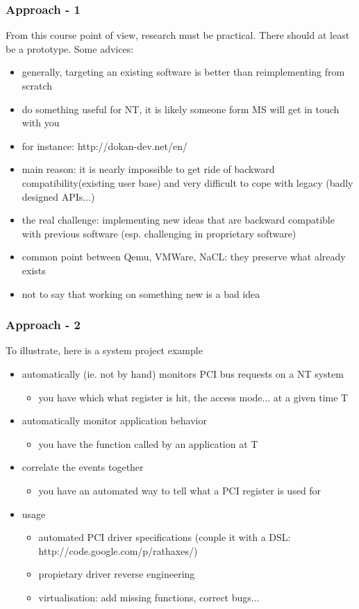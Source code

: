 \begin{frame}
  \frametitle{Approach - 1}
  From this course point of view, research must be practical.
  There should at least be a prototype. Some advices:
  \begin{itemize}
    \item
      generally, targeting an existing software is better than reimplementing from scratch
    \item
      do something useful for NT, it is likely someone form MS will get in touch with you
    \item
      for instance: http://dokan-dev.net/en/
    \item
      main reason: it is nearly impossible to get ride of backward compatibility(existing user base) and very difficult to cope with legacy (badly designed APIs...)
    \item
      the real challenge: implementing new ideas that are backward compatible
      with previous software (esp. challenging in proprietary software)
    \item
      common point between Qemu, VMWare, NaCL: they preserve what already exists
    \item
      not to say that working on something new is a bad idea
  \end{itemize}
\end{frame}

\begin{frame}
  \frametitle{Approach - 2}
  To illustrate, here is a system project example
  \begin{itemize}
  \item
    automatically (ie. not by hand) monitors PCI bus requests on a NT system
    \begin{itemize} \item you have which what register is hit, the access mode... at a given time T \end{itemize}
  \item
    automatically monitor application behavior
    \begin{itemize} \item you have the function called by an application at T \end{itemize}
  \item
    correlate the events together
    \begin{itemize} \item you have an automated way to tell what a PCI register is used for \end{itemize}
  \item
    usage
    \begin{itemize}
      \item automated PCI driver specifications (couple it with a DSL: http://code.google.com/p/rathaxes/)
      \item propietary driver reverse engineering
      \item virtualisation: add missing functions, correct bugs...
    \end{itemize}
  \end{itemize}
\end{frame}


